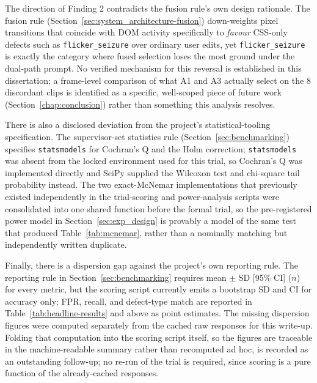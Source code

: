 The direction of Finding 2 contradicts the fusion rule's own design rationale. The fusion rule (Section~\ref{sec:system_architecture-fusion}) down-weights pixel transitions that coincide with DOM activity specifically to \emph{favour} CSS-only defects such as \texttt{flicker\_seizure} over ordinary user edits, yet \texttt{flicker\_seizure} is exactly the category where fused selection loses the most ground under the dual-path prompt. No verified mechanism for this reversal is established in this dissertation; a frame-level comparison of what A1 and A3 actually select on the 8 discordant clips is identified as a specific, well-scoped piece of future work (Section~\ref{chap:conclusion}) rather than something this analysis resolves.

There is also a disclosed deviation from the project's statistical-tooling specification. The supervisor-set statistics rule (Section~\ref{sec:benchmarking}) specifies \texttt{statsmodels} for Cochran's Q and the Holm correction; \texttt{statsmodels} was absent from the locked environment used for this trial, so Cochran's Q was implemented directly and SciPy supplied the Wilcoxon test and chi-square tail probability instead. The two exact-McNemar implementations that previously existed independently in the trial-scoring and power-analysis scripts were consolidated into one shared function before the formal trial, so the pre-registered power model in Section~\ref{sec:exp_design} is provably a model of the same test that produced Table~\ref{tab:mcnemar}, rather than a nominally matching but independently written duplicate.

Finally, there is a dispersion gap against the project's own reporting rule. The reporting rule in Section~\ref{sec:benchmarking} requires mean $\pm$ SD [95\% CI] ($n$) for every metric, but the scoring script currently emits a bootstrap SD and CI for accuracy only; FPR, recall, and defect-type match are reported in Table~\ref{tab:headline-results} and above as point estimates. The missing dispersion figures were computed separately from the cached raw responses for this write-up. Folding that computation into the scoring script itself, so the figures are traceable in the machine-readable summary rather than recomputed ad hoc, is recorded as an outstanding follow-up; no re-run of the trial is required, since scoring is a pure function of the already-cached responses.

